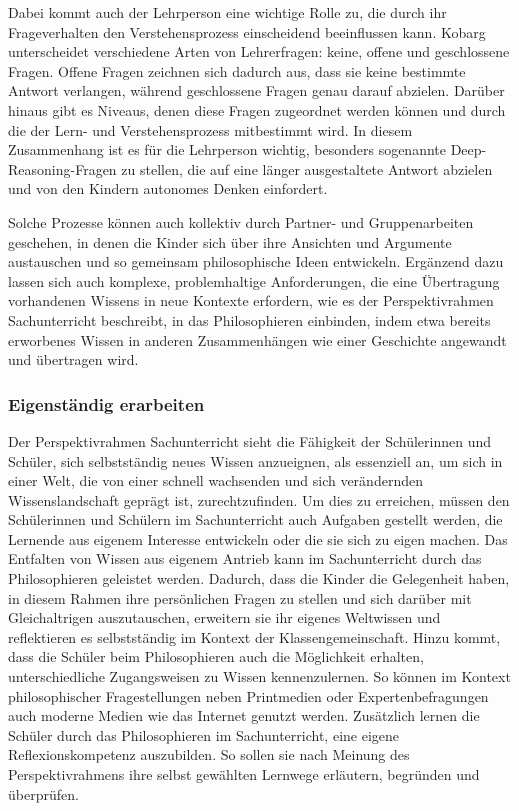 Dabei kommt auch der Lehrperson eine wichtige Rolle zu, die durch ihr Frageverhalten den Verstehensprozess einscheidend beeinflussen kann. 
Kobarg unterscheidet verschiedene Arten von Lehrerfragen: keine, offene und geschlossene Fragen. 
Offene Fragen zeichnen sich dadurch aus, dass sie keine bestimmte Antwort verlangen, während geschlossene Fragen genau darauf abzielen. 
Darüber hinaus gibt es Niveaus, denen diese Fragen zugeordnet werden können\cite[S.\,22]{HB15} und durch die der Lern- und Verstehensprozess mitbestimmt wird.
In diesem Zusammenhang ist es für die Lehrperson wichtig, besonders sogenannte \glqq Deep-Reasoning\grqq{}-Fragen zu stellen, die auf eine länger ausgestaltete Antwort abzielen und von den Kindern autonomes Denken einfordert. 

Solche Prozesse können auch kollektiv durch Partner- und Gruppenarbeiten geschehen, in denen die Kinder sich über ihre Ansichten und Argumente austauschen und so gemeinsam philosophische Ideen entwickeln. 
Ergänzend dazu lassen sich auch \glqq komplexe, problemhaltige Anforderungen, die eine Übertragung vorhandenen Wissens in neue Kontexte erfordern\grqq{}\cite[S.\,21]{GDS13}, wie es der Perspektivrahmen Sachunterricht beschreibt, in das Philosophieren einbinden, indem etwa bereits erworbenes Wissen in anderen Zusammenhängen wie einer Geschichte angewandt und übertragen wird. 

\newpage

\subsubsection{Eigenständig erarbeiten}


Der Perspektivrahmen Sachunterricht sieht die Fähigkeit der Schülerinnen und Schüler, sich selbstständig neues Wissen anzueignen, als essenziell an, um sich in einer Welt, die von einer schnell wachsenden und sich verändernden Wissenslandschaft geprägt ist, zurechtzufinden. 
Um dies zu erreichen, müssen den Schülerinnen und Schülern im Sachunterricht auch Aufgaben gestellt werden, \glqq die Lernende aus eigenem Interesse entwickeln oder die sie sich zu eigen machen.\grqq{}\cite[S.\,22]{GDS13}
Das Entfalten von Wissen aus eigenem Antrieb kann im Sachunterricht durch das Philosophieren geleistet werden. 
Dadurch, dass die Kinder die Gelegenheit haben, in diesem Rahmen ihre persönlichen Fragen zu stellen und sich darüber mit Gleichaltrigen auszutauschen, erweitern sie ihr eigenes Weltwissen und reflektieren es selbstständig im Kontext der Klassengemeinschaft. 
Hinzu kommt, dass die Schüler beim Philosophieren auch die Möglichkeit erhalten, unterschiedliche Zugangsweisen zu Wissen kennenzulernen. 
So können im Kontext philosophischer Fragestellungen neben Printmedien oder Expertenbefragungen auch moderne Medien wie das Internet genutzt werden.
Zusätzlich lernen die Schüler durch das Philosophieren im Sachunterricht, eine eigene Reflexionskompetenz auszubilden. 
So sollen sie nach Meinung des Perspektivrahmens \glqq ihre selbst gewählten Lernwege erläutern, begründen und überprüfen.\grqq{}\cite[S.\,23]{GDS13}


